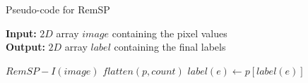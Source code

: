 \begin{algorithm}[ht]
\small
{
	\caption{Pseudo-code for RemSP}
	\label{alg:RemSP}
	\textbf{Input:} $2D$ array $image$ containing the pixel values \\
	\textbf{Output:} $2D$ array $label$ containing the final labels
	\begin{algorithmic}[1]
		\State $RemSP-I(image)$ 
		\State $flatten(p,count)$ 
		  
				\State $label(e) \gets p[label(e)]$
			\EndFor
		\EndFor
	\EndFunction
	\end{algorithmic}
}	
\end{algorithm}

